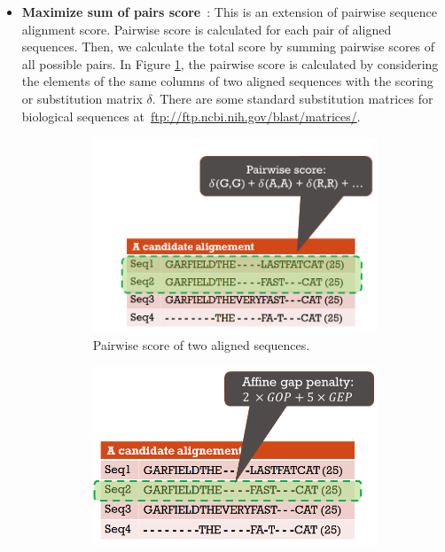 \begin{itemize}
	
	\item \textbf{Maximize sum of pairs score}~\cite{seeluangsawat2005multiple, da2010alineaga}:  
	This is an extension of pairwise sequence alignment score. Pairwise score is calculated for each pair of aligned sequences. Then, we calculate the total score by summing pairwise scores of all possible pairs. In Figure \ref{fig:pairwise}, the pairwise score is calculated by considering the elements of the same columns of two aligned sequences with the scoring or substitution matrix $\delta$. There are some standard substitution matrices for biological sequences at~\url{ftp://ftp.ncbi.nih.gov/blast/matrices/}.
	
	
	\begin{figure}[!htbp]
		\begin{adjustwidth}{-0.2cm}{}
			\centering
			\begin{subfigure}[b]{0.5\columnwidth}
				\includegraphics[width=\columnwidth]{Figure/pairwise}
				\caption{Pairwise score of two aligned sequences.}
				\label{fig:pairwise}
			\end{subfigure}	
			\begin{subfigure}[b]{0.5\columnwidth}
				\includegraphics[width=\columnwidth]{Figure/agp}

\end{subfigure}
\end{adjustwidth}
\end{figure}
\end{itemize}
